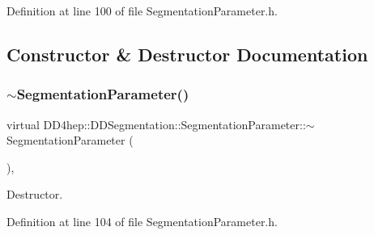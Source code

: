 Definition at line 100 of file Segmentation\+Parameter.\+h.



\subsection{Constructor \& Destructor Documentation}
\hypertarget{class_d_d4hep_1_1_d_d_segmentation_1_1_segmentation_parameter_a3969aaa62788ba8e9c5fe9f1ce60fe98}{}\label{class_d_d4hep_1_1_d_d_segmentation_1_1_segmentation_parameter_a3969aaa62788ba8e9c5fe9f1ce60fe98} 
\subsubsection{\texorpdfstring{$\sim$\+Segmentation\+Parameter()}{~SegmentationParameter()}}
{\footnotesize\ttfamily virtual D\+D4hep\+::\+D\+D\+Segmentation\+::\+Segmentation\+Parameter\+::$\sim$\+Segmentation\+Parameter (\begin{DoxyParamCaption}{ }\end{DoxyParamCaption})\hspace{0.3cm}{\ttfamily [inline]}, {\ttfamily [virtual]}}



Destructor. 



Definition at line 104 of file Segmentation\+Parameter.\+h.

\hypertarget{class_d_d4hep_1_1_d_d_segmentation_1_1_segmentation_parameter_ae3d7cad507474b45ed2aea1629b8a919}{}\label{class_d_d4hep_1_1_d_d_segmentation_1_1_segmentation_parameter_ae3d7cad507474b45ed2aea1629b8a919} 
